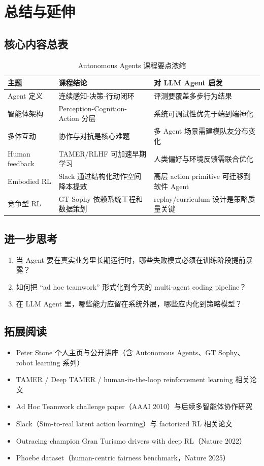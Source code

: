 \section{总结与延伸}

\subsection{核心内容总表}
\begin{table}[H]
\centering
\begin{tabular}{p{2.8cm}p{4.5cm}p{4.2cm}}
\toprule
\textbf{主题} & \textbf{课程结论} & \textbf{对 LLM Agent 启发} \\
\midrule
Agent 定义 & 连续感知-决策-行动闭环 & 评测要覆盖多步行为结果 \\
智能体架构 & Perception-Cognition-Action 分层 & 系统可调试性优先于端到端神化 \\
多体互动 & 协作与对抗是核心难题 & 多 Agent 场景需建模队友分布变化 \\
Human feedback & TAMER/RLHF 可加速早期学习 & 人类偏好与环境反馈需联合优化 \\
Embodied RL & Slack 通过结构化动作空间降本提效 & 高层 action primitive 可迁移到软件 Agent \\
竞争型 RL & GT Sophy 依赖系统工程和数据策划 & replay/curriculum 设计是策略质量关键 \\
\bottomrule
\end{tabular}
\caption{Autonomous Agents 课程要点浓缩}
\end{table}

\subsection{进一步思考}
\begin{enumerate}
    \item 当 Agent 要在真实业务里长期运行时，哪些失败模式必须在训练阶段提前暴露？
    \item 如何把 ``ad hoc teamwork'' 形式化到今天的 multi-agent coding pipeline？
    \item 在 LLM Agent 里，哪些能力应留在系统外层，哪些应内化到策略模型？
\end{enumerate}

\subsection{拓展阅读}
\begin{itemize}
    \item Peter Stone 个人主页与公开讲座（含 Autonomous Agents、GT Sophy、robot learning 系列）
    \item TAMER / Deep TAMER / human-in-the-loop reinforcement learning 相关论文
    \item Ad Hoc Teamwork challenge paper（AAAI 2010）与后续多智能体协作研究
    \item Slack（Sim-to-real latent action learning）与 factorized RL 相关论文
    \item Outracing champion Gran Turismo drivers with deep RL（Nature 2022）
    \item Phoebe dataset（human-centric fairness benchmark，Nature 2025）
\end{itemize}


